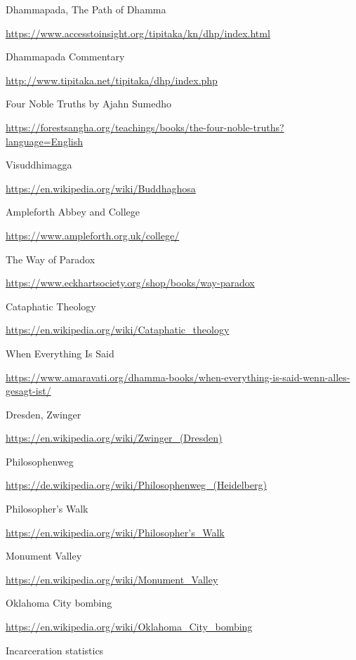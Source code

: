 \begin{thebibliography}{9}
 Dhammapada, The Path of Dhamma

  {\urlsize \url{https://www.accesstoinsight.org/tipitaka/kn/dhp/index.html}}

 Dhammapada Commentary

  {\urlsize \url{http://www.tipitaka.net/tipitaka/dhp/index.php}}

 Four Noble Truths by Ajahn Sumedho

  {\urlsize \url{https://forestsangha.org/teachings/books/the-four-noble-truths?language=English}}

 Visuddhimagga

  {\urlsize \url{https://en.wikipedia.org/wiki/Buddhaghosa}}

 Ampleforth Abbey and College

  {\urlsize \url{https://www.ampleforth.org.uk/college/}}

 The Way of Paradox

  {\urlsize \url{https://www.eckhartsociety.org/shop/books/way-paradox}}

 Cataphatic Theology

  {\urlsize \url{https://en.wikipedia.org/wiki/Cataphatic_theology}}

 When Everything Is Said

  {\urlsize \url{https://www.amaravati.org/dhamma-books/when-everything-is-said-wenn-alles-gesagt-ist/}}

 Dresden, Zwinger

  {\urlsize \url{https://en.wikipedia.org/wiki/Zwinger_(Dresden)}}

 Philosophenweg

  {\urlsize \url{https://de.wikipedia.org/wiki/Philosophenweg_(Heidelberg)}}

 Philosopher's Walk

  {\urlsize \url{https://en.wikipedia.org/wiki/Philosopher's_Walk}}

 Monument Valley

  {\urlsize \url{https://en.wikipedia.org/wiki/Monument_Valley}}

 Oklahoma City bombing

  {\urlsize \url{https://en.wikipedia.org/wiki/Oklahoma_City_bombing}}

 Incarceration statistics


\end{thebibliography}
